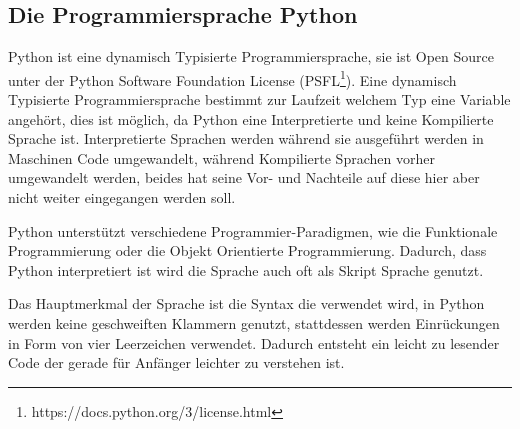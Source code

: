 \subsection{Die Programmiersprache Python}\label{einleitung:python}

Python ist eine dynamisch Typisierte Programmiersprache, sie ist Open Source
unter der Python Software Foundation License
(PSFL\footnote{https://docs.python.org/3/license.html}). Eine dynamisch
Typisierte Programmiersprache bestimmt zur Laufzeit welchem Typ eine Variable
angehört, dies ist möglich, da Python eine Interpretierte und keine Kompilierte
Sprache ist. Interpretierte Sprachen werden während sie ausgeführt werden in
Maschinen Code umgewandelt, während Kompilierte Sprachen vorher umgewandelt
werden, beides hat seine Vor- und Nachteile auf diese hier aber nicht weiter
eingegangen werden soll.

Python unterstützt verschiedene Programmier-Paradigmen, wie die Funktionale
Programmierung oder die Objekt Orientierte Programmierung. Dadurch, dass Python
interpretiert ist wird die Sprache auch oft als Skript Sprache genutzt.

Das Hauptmerkmal der Sprache ist die Syntax die verwendet wird, in Python
werden keine geschweiften Klammern genutzt, stattdessen werden Einrückungen in
Form von vier Leerzeichen verwendet. Dadurch entsteht ein leicht zu lesender
Code der gerade für Anfänger leichter zu verstehen ist.